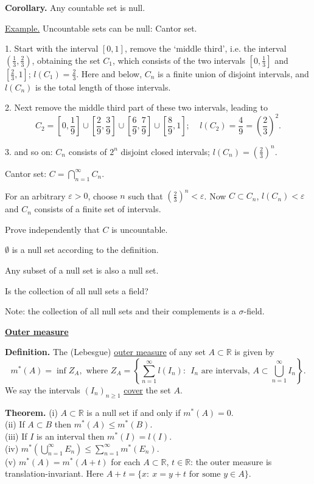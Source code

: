 \documentclass[a4paper,10pt]{article}
\def\RR{\mathbb{R}}
\newcommand{\1}[1]{\mathbf{1}_{\{#1\}}}
\begin{document}
{\bf Corollary.} Any countable set is null. \vspace{3mm}

\underline{Example.} Uncountable sets can be null: Cantor set.

1. Start with the interval $[0,1]$, remove the `middle third', i.e. the interval $(\frac{1}{3},\frac{2}{3})$, obtaining the set $C_1$, which consists of the two intervals $[0,\frac{1}{3}]$ and $[\frac{2}{3},1]$; $l(C_1)=\frac{2}{3}$. Here and below, $C_n$ is a finite union of disjoint intervals, and $l(C_n)$ is the total length of those intervals.

2. Next remove the middle third part of these two intervals, leading to
  $$C_2=[0,\frac{1}{9}]\cup[\frac{2}{9},\frac{3}{9}]\cup[\frac{6}{9},\frac{7}{9}]\cup[\frac{8}{9},1];~~~~~l(C_2)=\frac{4}{9}=\left(\frac{2}{3}\right)^2.$$

3. and so on: $C_n$ consists of $2^n$ disjoint closed intervals; $l(C_n)=\left(\frac{2}{3}\right)^n$.

Cantor set: $C=\bigcap_{n=1}^\infty C_n$.

For an arbitrary $\varepsilon>0$, choose $n$ such that $\left(\frac{2}{3}\right)^n<\varepsilon$. Now $C\subset C_n$, $l(C_n)<\varepsilon$ and $C_n$ consists of a finite set of intervals.

Prove independently that $C$ is uncountable.\vspace{3mm}

$\emptyset$ is a null set according to the definition.

Any subset of a null set is also a null set.

Is the collection of all null sets a field?

Note: the collection of all null sets and their complements is a $\sigma$-field. \vspace{3mm}

\begin{center}\bf\underline{Outer measure} \end{center}\vspace{3mm}

{\bf Definition.} The (Lebesgue) \underline{outer measure} of any set $A\subset\RR$ is given by
  $$m^*(A)=\inf Z_A, \mbox{ where } Z_A=\left\{\sum_{n=1}^\infty l(I_n):~~I_n \mbox{ are intervals, } A\subset \bigcup_{n=1}^\infty I_n\right\}.$$
We say the intervals $(I_n)_{n\ge 1}$ \underline{cover} the set $A$.\vspace{3mm}

{\bf Theorem.} (i) $A\subset\RR$ is a null set if and only if $m^*(A)=0$.\\
(ii) If $A\subset B$ then  $m^*(A)\le m^*(B)$.\\
(iii) If $I$ is an interval then $m^*(I)=l(I)$.\\
(iv) $m^*(\bigcup_{n=1}^\infty E_n)\le\sum_{n=1}^\infty m^*(E_n)$.\\
(v) $m^*(A)=m^*(A+t)$ for each $A\subset\RR$, $t\in\RR$: the outer measure is translation-invariant.
Here $A+t=\{x:~x=y+t \mbox{ for some } y\in A\}$.
\vspace{3mm}
\end{document}
